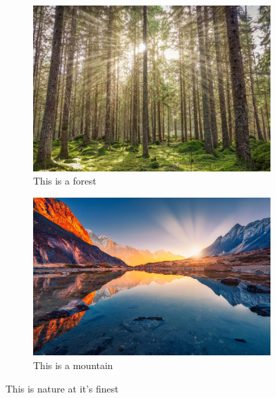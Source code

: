 \documentclass{article}
\begin{document}
        \begin{figure}[!htp]
            \begin{subfigure}[b]{0.45\linewidth}
                \centering
                \includegraphics[width=\textwidth]{forest.jpg}
                \caption{This is a forest}
                \label{fig:forest}
            \end{subfigure}
        \hspace{0.5cm}
            \begin{subfigure}[b]{0.45\linewidth}
                \centering
                \includegraphics[width=\textwidth]{mountain.jpg}
                \caption{This is a mountain}
                \label{fig:mountain}
            \end{subfigure}
        \caption{This is nature at it's finest}
        \label{fig:nature}
        \end{figure}
\end{document}
